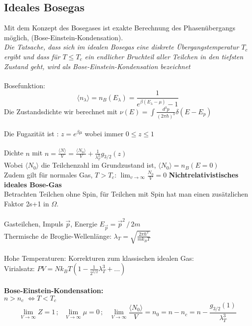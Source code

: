\documentclass[a4paper,11pt]{scrartcl}
\begin{document}
\subsection{Ideales Bosegas}
Mit dem Konzept des Bosegases ist exakte Berechnung des Phasenübergangs möglich, (Bose-Einstein-Kondensation).\\
\textit{Die Tatsache, dass sich im idealen Bosegas eine diskrete Übergangstemperatur $T_c$ ergibt und dass für $T \leq T_c$ ein endlicher Bruchteil aller Teilchen in den tiefsten Zustand geht, wird als Bose-Einstein-Kondensation bezeichnet}\\
\\
Bosefunktion: 
\begin{equation}
 \langle n_{\lambda} \rangle = n_B (E_{\lambda}) = \frac{1}{e^{\beta(E_{\lambda}-\mu)}-1}
\end{equation}
Die Zustandsdichte wir berechnet mit $\nu (E) = \int \frac{d^3p}{(2 \pi \hbar)^3} \delta (E-E_p) $\\
\\
Die Fugazität ist : $z = e^{\beta \mu}$ wobei immer $0 \leq z \leq 1$\\
\\
Dichte $n$ mit $n = \frac{\langle N \rangle}{V} = \frac{\langle N_0 \rangle}{V} + \frac{1}{\lambda_T^3} g_{3/2}(z)$\\
Wobei $\langle N_0 \rangle$ die Teilchenzahl im Grundzustand ist, $\langle N_0 \rangle = n_B(E=0)$\\
Zudem gilt für normales Gas, $T > T_c$: $\lim_{v \rightarrow \infty} \frac{N_0}{V} = 0$
\textbf{Nichtrelativistisches ideales Bose-Gas}\\
Betrachten Teilchen ohne Spin, für Teilchen mit Spin hat man einen zusätzlichen Faktor 2s+1 in $\Omega$.\\
\\
Gasteilchen, Impuls $\vec{p}$, Energie $E_{\vec{p}} = \vec{p}^2\, /\, 2m$\\
Thermische de Broglie-Wellenlänge: $\lambda_T = \sqrt{\frac{2 \pi \hbar^2}{m k_B T}}$\\
\\
Hohe Temperaturen: Korrekturen zum klassischen idealen Gas:\\
Virialsatz: $PV = N k_B T (1-\frac{1}{2^{5/2}} \lambda_T^3 + ...)$\\
\\
\textbf{Bose-Einstein-Kondensation:}\\
$n>n_c \,\,\Leftrightarrow T< T_c$\\
\begin{equation}
 \lim_{V \rightarrow \infty} Z = 1\, ;\,\,\,\, \lim_{V \rightarrow \infty} \mu = 0\, ; \,\,\,\,\, \lim_{V \rightarrow \infty} \frac{\langle N_0 \rangle }{V} = n_0 = n-n_c = n-\frac{g_{3/2}(1)}{\lambda_T^3}
\end{equation}
\end{document}
